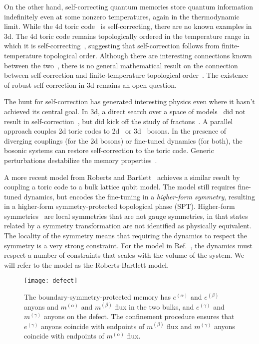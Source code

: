 On the other hand, self-correcting quantum memories store quantum information indefinitely even at some nonzero temperatures, again in the thermodynamic limit. While the 4d toric code~\cite{Dennis2002Topological} is self-correcting, there are no known examples in 3d. The 4d toric code remains topologically ordered in the temperature range in which it is self-correcting~\cite{Hastings2011Topological}, suggesting that self-correction follows from finite-temperature topological order. Although there are interesting connections known between the two~\cite{Yoshida2011Self}, there is no general mathematical  result on the connection between self-correction and finite-temperature topological order~\cite{RobertsBartlett2020}. The existence of robust self-correction in 3d remains an open question.

The hunt for self-correction has generated interesting physics even where it hasn't achieved its central goal. In 3d, a direct search over a space of models~\cite{Haah2011Code} did not result in self-correction~\cite{Siva2017Marginally, PremHaahNandkishore2017}, but did kick off the study of fractons~\cite{Vijay2016Fracton, NandkishoreHermele2019, Pretko2020Fracton}. 
A parallel approach couples 2d toric codes to 2d~\cite{Hamma2009Toric} or 3d~\cite{Pedrocchi2013Thermal} bosons. In the presence of diverging couplings (for the 2d bosons) or fine-tuned dynamics (for both), the bosonic systems can restore self-correction to the toric code. Generic perturbations destabilize the memory properties~\cite{LandonCardinal2015}. 

A more recent model from Roberts and Bartlett~\cite{RobertsBartlett2020} achieves a similar result by coupling a toric code to a bulk lattice qubit model. The model still requires fine-tuned dynamics, but encodes the fine-tuning in a \emph{higher-form symmetry}, resulting in a higher-form symmetry-protected topological phase (SPT). Higher-form symmetries~\cite{Nussinov2009Topological, Gaiotto2015Generalized, Lake2018Higher} are local symmetries that are not gauge symmetries, in that states related by a symmetry transformation are not identified as physically equivalent. The locality of the symmetry means that requiring the dynamics to respect the symmetry is a very strong constraint. For the model in Ref.~\cite{RobertsBartlett2020}, the dynamics must respect a number of constraints that scales with the volume of the system. We will refer to the model as the Roberts-Bartlett model.

\begin{figure}
    \centering
    \texttt{[image: defect]}
    \caption[Effective description of the model]{The boundary-symmetry-protected memory has $e^{(\alpha)}$ and $e^{(\beta)}$ anyons and $m^{(\alpha)}$ and $m^{(\beta)}$ flux in the two bulks, and $e^{(\gamma)}$ and $m^{(\gamma)}$ anyons on the defect. The confinement procedure ensures that $e^{(\gamma)}$ anyons coincide with endpoints of $m^{(\beta)}$ flux and $m^{(\gamma)}$ anyons coincide with endpoints of $m^{(\alpha)}$ flux.}
    \label{fig:defect}
\end{figure}

